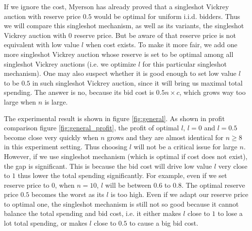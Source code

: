 If we ignore the cost, Myerson has already proved that a singleshot Vickrey
auction with reserve price $0.5$ would be optimal for uniform i.i.d. bidders.
Thus we will compare this singleshot mechanism, as well as its variants, the
singleshot Vickrey auction with $0$ reserve price. But be aware of that reserve
price is not equivalent with low value $l$  when cost exists. To make it more fair,
we add one more singleshot Vickrey auction whose reserve is set to be optimal
among all singleshot Vickrey auctions (i.e. we optimize $l$ for this particular
singleshot mechanism).
One may also suspect whether it is good enough to set low value $l$ to be $0.5$
in such singleshot Vickrey auction, since it will bring us maximal total
spending. The answer is no, because its bid cost is $0.5 n \times c$, which
grows way too large when $n$ is large.

The experimental result is shown in figure \ref{fig:general}. As shown in
profit comparison figure \ref{fig:general_profit}, the profit of optimal $l$,
$l = 0$ and $l = 0.5$ become close very quickly when $n$ grows and they are
almost identical for $n \geq 8$ in this experiment setting. Thus choosing $l$
will not be a critical issue for large $n$. However, if we use singleshot
mechanism (which is optimal if cost does not exist), the gap is significant.
This is because the bid cost will drive low value $l$ very
close to $1$ thus lower the total spending significantly. For example, even if
we set reserve price to $0$, when $n = 10$, $l$ will be between $0.6$ to $0.8$.
The optimal reserve price $0.5$ becomes the worst as its $l$ is too high. 
Even if we adapt our reserve price to optimal one, the singleshot mechanism is
still not so good because it cannot balance the total spending and bid cost,
i.e. it either makes $l$ close to $1$ to lose a lot total spending, or makes
$l$ close to $0.5$ to cause a big bid cost.
